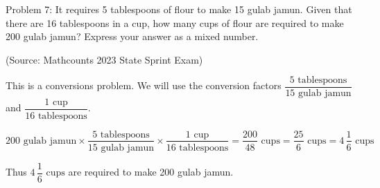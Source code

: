 Problem 7: It requires 5 tablespoons of flour to make 15 gulab jamun. Given that there are 16 tablespoons in a cup, how many cups of flour are required to make 200 gulab jamun? Express your answer as a mixed number.

(Source: Mathcounts 2023 State Sprint Exam)

This is a conversions problem. We will use the conversion factors $\dfrac{5 \text{ tablespoons}}{15 \text{ gulab jamun}}$ and $\dfrac{1 \text{ cup}}{16 \text{ tablespoons}}$.

$$ 200 \text{ gulab jamun} \times \frac{5 \text{ tablespoons}}{15 \text{ gulab jamun}} \times \frac{1 \text{ cup}}{16 \text{ tablespoons}} = \frac{200}{48} \text{ cups} = \frac{25}{6} \text{ cups} = \boxed{4 \, \frac{1}{6} \text{ cups}} $$

Thus $\boxed{4 \, \dfrac{1}{6} \text{ cups}}$ are required to make 200 gulab jamun.
